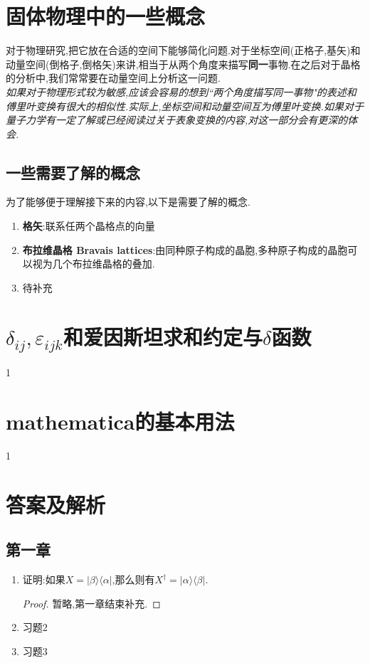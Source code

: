 \documentclass[lang=cn,newtx,10pt,scheme=chinese,thmcnt=section]{elegantbook}
\begin{document}
\chapter{固体物理中的一些概念}
对于物理研究,把它放在合适的空间下能够简化问题.对于坐标空间(正格子,基矢)和动量空间(倒格子,倒格矢)来讲,相当于从两个角度来描写\textbf{同一}事物.在之后对于晶格的分析中,我们常常要在动量空间上分析这一问题.\\
\textit{如果对于物理形式较为敏感,应该会容易的想到``两个角度描写同一事物"的表述和傅里叶变换有很大的相似性.实际上,坐标空间和动量空间互为傅里叶变换.如果对于量子力学有一定了解或已经阅读过关于表象变换的内容,对这一部分会有更深的体会.}
\section*{一些需要了解的概念}
为了能够便于理解接下来的内容,以下是需要了解的概念.
\begin{enumerate}
	\item \textbf{格矢}:联系任两个晶格点的向量
	\item \textbf{布拉维晶格 Bravais lattices}:由同种原子构成的晶胞,多种原子构成的晶胞可以视为几个布拉维晶格的叠加.
	\item 待补充
\end{enumerate}


\chapter{$\delta_{ij},\varepsilon_{ijk}$和爱因斯坦求和约定与$\delta$函数}
1
\chapter{mathematica的基本用法}
1
\chapter{答案及解析}
\section*{第一章}
\begin{enumerate}
	\item 证明:如果$X=|\beta\rangle\langle\alpha|$,那么则有$X^\dagger=|\alpha\rangle\langle\beta|$.
	\begin{proof}
		暂略,第一章结束补充.
	\end{proof}
	\item 习题2
	\item 习题3
\end{enumerate}
\end{document}
